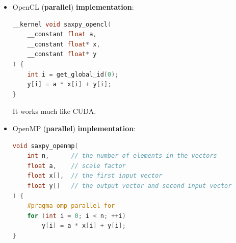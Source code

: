 \begin{itemize}
    \item OpenCL (\textbf{parallel}) \textbf{implementation}:
    \begin{lstlisting}[language=c]
__kernel void saxpy_opencl(
    __constant float a,
    __constant float* x,
    __constant float* y
) {
    int i = get_global_id(0);
    y[i] = a * x[i] + y[i];
}\end{lstlisting}
    It works much like CUDA.

    \item OpenMP (\textbf{parallel}) \textbf{implementation}:
    \begin{lstlisting}[language=c]
void saxpy_openmp(
    int n,      // the number of elements in the vectors
    float a,    // scale factor
    float x[],  // the first input vector
    float y[]   // the output vector and second input vector
) {
    #pragma omp parallel for
    for (int i = 0; i < n; ++i)
        y[i] = a * x[i] + y[i];
}\end{lstlisting}
\end{itemize}
